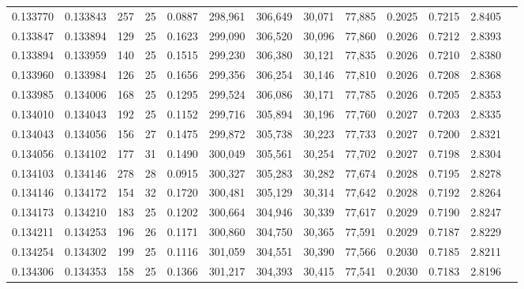 \begin{tabular}{rrrrrrrrrrrrr}
0.133770 & 0.133843 & 257 &  25 &                                     0.0887 & 298,961 & 306,649 &  30,071 &  77,885 & 0.2025 & 0.7215 & 2.8405 \\
0.133847 & 0.133894 & 129 &  25 &                                     0.1623 & 299,090 & 306,520 &  30,096 &  77,860 & 0.2026 & 0.7212 & 2.8393 \\
0.133894 & 0.133959 & 140 &  25 &                                     0.1515 & 299,230 & 306,380 &  30,121 &  77,835 & 0.2026 & 0.7210 & 2.8380 \\
0.133960 & 0.133984 & 126 &  25 &                                     0.1656 & 299,356 & 306,254 &  30,146 &  77,810 & 0.2026 & 0.7208 & 2.8368 \\
0.133985 & 0.134006 & 168 &  25 &                                     0.1295 & 299,524 & 306,086 &  30,171 &  77,785 & 0.2026 & 0.7205 & 2.8353 \\
0.134010 & 0.134043 & 192 &  25 &                                     0.1152 & 299,716 & 305,894 &  30,196 &  77,760 & 0.2027 & 0.7203 & 2.8335 \\
0.134043 & 0.134056 & 156 &  27 &                                     0.1475 & 299,872 & 305,738 &  30,223 &  77,733 & 0.2027 & 0.7200 & 2.8321 \\
0.134056 & 0.134102 & 177 &  31 &                                     0.1490 & 300,049 & 305,561 &  30,254 &  77,702 & 0.2027 & 0.7198 & 2.8304 \\
0.134103 & 0.134146 & 278 &  28 &                                     0.0915 & 300,327 & 305,283 &  30,282 &  77,674 & 0.2028 & 0.7195 & 2.8278 \\
0.134146 & 0.134172 & 154 &  32 &                                     0.1720 & 300,481 & 305,129 &  30,314 &  77,642 & 0.2028 & 0.7192 & 2.8264 \\
0.134173 & 0.134210 & 183 &  25 &                                     0.1202 & 300,664 & 304,946 &  30,339 &  77,617 & 0.2029 & 0.7190 & 2.8247 \\
0.134211 & 0.134253 & 196 &  26 &                                     0.1171 & 300,860 & 304,750 &  30,365 &  77,591 & 0.2029 & 0.7187 & 2.8229 \\
0.134254 & 0.134302 & 199 &  25 &                                     0.1116 & 301,059 & 304,551 &  30,390 &  77,566 & 0.2030 & 0.7185 & 2.8211 \\
0.134306 & 0.134353 & 158 &  25 &                                     0.1366 & 301,217 & 304,393 &  30,415 &  77,541 & 0.2030 & 0.7183 & 2.8196 \\

\end{tabular}
